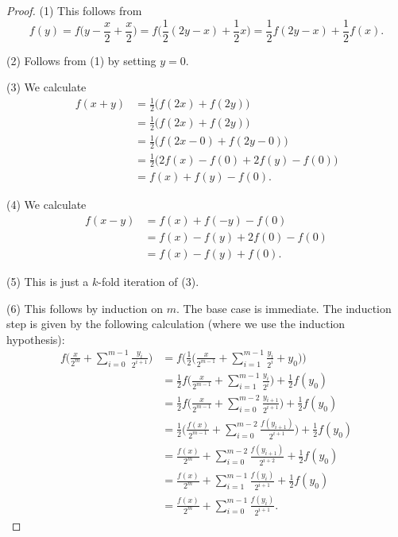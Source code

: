 \begin{proof}
(1) This follows from
\[ f(y) = f\Big(y - \frac{x}{2} + \frac{x}{2}\Big) = f\Big(\frac{1}{2}(2y - x) + \frac{1}{2}x\Big) = \frac{1}{2}f(2y-x) + \frac{1}{2}f(x). \]

(2) Follows from (1) by setting $y=0$.

(3) We calculate
\begin{align*}
f(x+y) &= \frac{1}{2}\Big(f(2x)+f(2y)\Big) \\
&= \frac{1}{2}\Big(f(2x)+f(2y)\Big) \\
&= \frac{1}{2}\Big(f(2x-0)+f(2y-0)\Big) \\
&= \frac{1}{2}\Big(2f(x)-f(0)+2f(y)-f(0)\Big) \\
&= f(x) + f(y) - f(0).
\end{align*}

(4) We calculate
\begin{align*}
f(x-y) &= f(x) + f(-y) - f(0) \\
&= f(x) - f(y) +2f(0) - f(0) \\
&= f(x) - f(y) + f(0).
\end{align*}

(5) This is just a $k$-fold iteration of (3).

(6) This follows by induction on $m$. The base case is immediate. The induction step is given by the following calculation (where we use the induction hypothesis):
\begin{align*}
f\Big(\frac{x}{2^m} + \sum_{i=0}^{m-1} \frac{y_i}{2^{i+1}}\Big) &= f\bigg(\frac{1}{2}\Big(\frac{x}{2^{m-1}} + \sum_{i=1}^{m-1} \frac{y_i}{2^i} + y_0\Big)\bigg) \\
&= \frac{1}{2}f\Big(\frac{x}{2^{m-1}} + \sum_{i=1}^{m-1} \frac{y_i}{2^i}\Big) + \frac{1}{2}f(y_0) \\
&= \frac{1}{2}f\Big(\frac{x}{2^{m-1}} + \sum_{i=0}^{m-2} \frac{y_{i+1}}{2^{i+1}}\Big) + \frac{1}{2}f(y_0) \\
&= \frac{1}{2}\Big(\frac{f(x)}{2^{m-1}} + \sum_{i=0}^{m-2} \frac{f(y_{i+1})}{2^{i+1}}\Big) + \frac{1}{2}f(y_0) \\
&= \frac{f(x)}{2^{m}} + \sum_{i=0}^{m-2} \frac{f(y_{i+1})}{2^{i+2}} + \frac{1}{2}f(y_0) \\
&= \frac{f(x)}{2^{m}} + \sum_{i=1}^{m-1} \frac{f(y_{i})}{2^{i+1}} + \frac{1}{2}f(y_0) \\
&= \frac{f(x)}{2^{m}} + \sum_{i=0}^{m-1} \frac{f(y_{i})}{2^{i+1}}.
\end{align*}


\end{proof}
